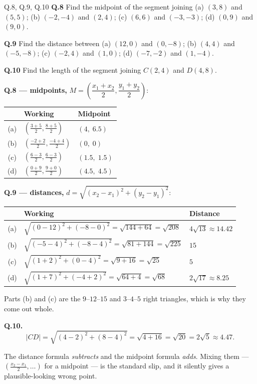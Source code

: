 \begin{question}{Q.8, Q.9, Q.10}
\textbf{Q.8} Find the midpoint of the segment joining
(a) $(3,8)$ and $(5,5)$; (b) $(-2,-4)$ and $(2,4)$;
(c) $(6,6)$ and $(-3,-3)$; (d) $(0,9)$ and $(9,0)$.

\smallskip
\textbf{Q.9} Find the distance between
(a) $(12,0)$ and $(0,-8)$; (b) $(4,4)$ and $(-5,-8)$;
(c) $(-2,4)$ and $(1,0)$; (d) $(-7,-2)$ and $(1,-4)$.

\smallskip
\textbf{Q.10} Find the length of the segment joining $C(2,4)$ and $D(4,8)$.
\end{question}

\begin{solution}
\textbf{Q.8 --- midpoints,} $M=\left(\dfrac{x_1+x_2}{2},\dfrac{y_1+y_2}{2}\right)$:

\begin{center}
\small\sffamily
\begin{tabular}{@{}c L{6.4cm} C{3.4cm}@{}}
\toprule
 & Working & Midpoint \\
\midrule
(a) & $\left(\tfrac{3+5}{2},\tfrac{8+5}{2}\right)$      & $(4,\;6.5)$ \\
(b) & $\left(\tfrac{-2+2}{2},\tfrac{-4+4}{2}\right)$    & $(0,\;0)$ \\
(c) & $\left(\tfrac{6-3}{2},\tfrac{6-3}{2}\right)$      & $(1.5,\;1.5)$ \\
(d) & $\left(\tfrac{0+9}{2},\tfrac{9+0}{2}\right)$      & $(4.5,\;4.5)$ \\
\bottomrule
\end{tabular}
\end{center}

\medskip
\textbf{Q.9 --- distances,}
$d=\sqrt{(x_2-x_1)^{2}+(y_2-y_1)^{2}}$:

\begin{center}
\small\sffamily
\begin{tabular}{@{}c L{7.0cm} C{3.6cm}@{}}
\toprule
 & Working & Distance \\
\midrule
(a) & $\sqrt{(0-12)^{2}+(-8-0)^{2}}=\sqrt{144+64}=\sqrt{208}$ & $4\sqrt{13}\approx 14.42$ \\
(b) & $\sqrt{(-5-4)^{2}+(-8-4)^{2}}=\sqrt{81+144}=\sqrt{225}$ & $15$ \\
(c) & $\sqrt{(1+2)^{2}+(0-4)^{2}}=\sqrt{9+16}=\sqrt{25}$      & $5$ \\
(d) & $\sqrt{(1+7)^{2}+(-4+2)^{2}}=\sqrt{64+4}=\sqrt{68}$     & $2\sqrt{17}\approx 8.25$ \\
\bottomrule
\end{tabular}
\end{center}

Parts (b) and (c) are the $9$--$12$--$15$ and $3$--$4$--$5$ right triangles,
which is why they come out whole.

\medskip
\textbf{Q.10.}
\[
|CD|=\sqrt{(4-2)^{2}+(8-4)^{2}}=\sqrt{4+16}=\sqrt{20}=2\sqrt5\approx 4.47 .
\]

\end{solution}

\begin{pitfall}
The distance formula \emph{subtracts} and the midpoint formula \emph{adds}.
Mixing them --- $\left(\tfrac{x_2-x_1}{2},\dots\right)$ for a midpoint --- is
the standard slip, and it silently gives a plausible-looking wrong point.
\end{pitfall}
